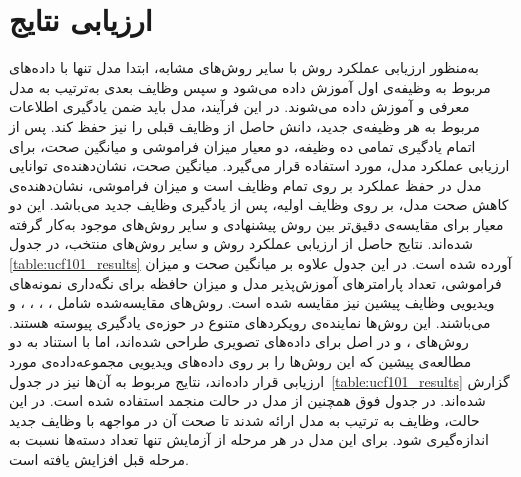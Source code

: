 \section{ارزیابی نتایج}
به‌منظور ارزیابی عملکرد روش 
با سایر روش‌های مشابه، ابتدا مدل تنها با داده‌های مربوط به وظیفه‌ی اول آموزش داده می‌شود و سپس وظایف بعدی به‌ترتیب به مدل معرفی و آموزش داده می‌شوند. در این فرآیند، مدل باید ضمن یادگیری اطلاعات مربوط به هر وظیفه‌ی جدید، دانش حاصل از وظایف قبلی را نیز حفظ کند. پس از اتمام یادگیری تمامی ده وظیفه، دو معیار میزان فراموشی و میانگین صحت، برای ارزیابی عملکرد مدل، مورد استفاده قرار می‌گیرد. میانگین صحت، نشان‌دهنده‌ی توانایی مدل در حفظ عملکرد بر روی تمام وظایف است و میزان فراموشی، نشان‌دهنده‌ی کاهش صحت مدل، بر روی وظایف اولیه، پس از یادگیری وظایف جدید می‌باشد. این دو معیار برای مقایسه‌ی دقیق‌تر بین روش پیشنهادی و سایر روش‌های موجود به‌کار گرفته شده‌اند. 
نتایج حاصل از ارزیابی عملکرد روش  و سایر روش‌های منتخب، در جدول
\ref{table:ucf101_results}
آورده شده است. در این جدول علاوه بر میانگین صحت و میزان فراموشی، تعداد پارامترهای آموزش‌پذیر مدل و میزان حافظه‌ برای نگه‌داری نمونه‌های ویدیویی وظایف پیشین نیز مقایسه شده است.
روش‌های مقایسه‌شده شامل \cite{11}،
 \cite{7}،
  \cite{l2p}، \cite{TCD}،
 \cite{pivot} و \cite{open-vclip} می‌باشند. این روش‌ها نماینده‌ی رویکردهای متنوع در حوزه‌ی یادگیری پیوسته هستند. روش‌های ،  و  در اصل برای داده‌های تصویری طراحی شده‌اند، اما با استناد به دو مطالعه‌ی پیشین \cite{vclimb,rainbowprompt} که این روش‌ها را بر روی داده‌های ویدیویی مجموعه‌داده‌ی  مورد ارزیابی قرار داده‌اند، نتایج مربوط به آن‌ها نیز در
جدول~\ref{table:ucf101_results}
گزارش شده‌اند. در جدول فوق همچنین از مدل  در حالت منجمد استفاده شده است.  در این حالت، وظایف به ترتیب به مدل ارائه شدند تا صحت آن در مواجهه با وظایف جدید اندازه‌گیری شود. برای این مدل در هر مرحله از آزمایش تنها تعداد دسته‌ها نسبت به مرحله قبل افزایش یافته است.
